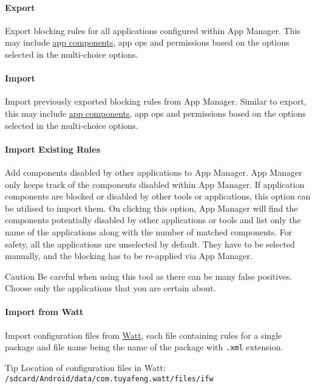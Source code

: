 \paragraph{Export} Export blocking rules for all applications configured within App Manager.
This may include \hyperref[subsec:faq:what-are-app-components]{app components}, app ops and permissions based on the options selected in the multi-choice options.

\paragraph{Import} Import previously exported blocking rules from App Manager.
Similar to export, this may include \hyperref[subsec:faq:what-are-app-components]{app components}, app ops and permissions based on the options selected in the multi-choice options.

\paragraph{Import Existing Rules}\label{par:import-existing-rules}
Add components disabled by other applications to App Manager. App Manager only keeps track of the components disabled within App Manager.
If application components are blocked or disabled by other tools or applications, this option can be utilised to import them.
On clicking this option, App Manager will find the components potentially disabled by other applications or tools and list only the name of the applications along with the number of matched components.
For safety, all the applications are unselected by default. They have to be selected manually, and the blocking has to be re-applied via App Manager.

\begin{danger}{Caution}
    Be careful when using this tool as there can be many false positives.
    Choose only the applications that you are certain about.
\end{danger}

\paragraph{Import from Watt} Import configuration files from \href{https://github.com/tuyafeng/Watt}{Watt}, each file
containing rules for a single package and file name being the name of the package with \texttt{.xml} extension.

\begin{tip}{Tip}
    Location of configuration files in Watt: \texttt{/sdcard/Android/data/com.tuyafeng.watt/files/ifw}
\end{tip}

